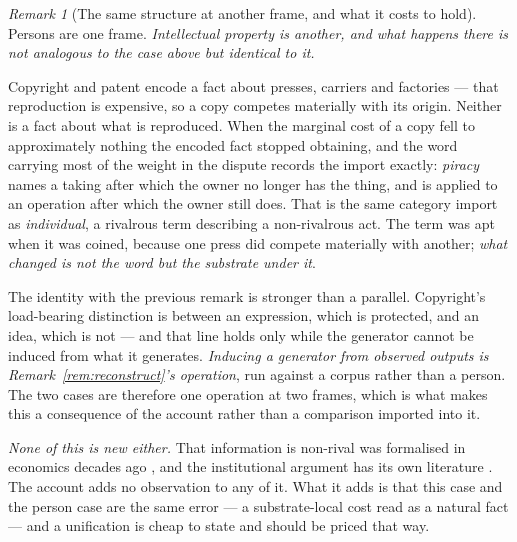 \documentclass[11pt,a4paper]{article}
\theoremstyle{remark}
\newtheorem{remark}[definition]{Remark}
\begin{document}
\begin{remark}[The same structure at another frame, and what it costs to hold]\label{rem:scarcity}
Persons are one frame. \emph{Intellectual property is another, and what happens there is not analogous
to the case above but identical to it.}

Copyright and patent encode a fact about presses, carriers and factories --- that reproduction is
expensive, so a copy competes materially with its origin. Neither is a fact about what is reproduced.
When the marginal cost of a copy fell to approximately nothing the encoded fact stopped obtaining, and
the word carrying most of the weight in the dispute records the import exactly: \emph{piracy} names a
taking after which the owner no longer has the thing, and is applied to an operation after which the
owner still does. That is the same category import as \emph{individual}, a rivalrous term describing a
non-rivalrous act. The term was apt when it was coined, because one press did compete materially with
another; \emph{what changed is not the word but the substrate under it}.

The identity with the previous remark is stronger than a parallel. Copyright's load-bearing distinction
is between an expression, which is protected, and an idea, which is not --- and that line holds only
while the generator cannot be induced from what it generates. \emph{Inducing a generator from observed
outputs is Remark~\ref{rem:reconstruct}'s operation}, run against a corpus rather than a person. The
two cases are therefore one operation at two frames, which is what makes this a consequence of the
account rather than a comparison imported into it.

\emph{None of this is new either.} That information is non-rival was formalised in economics decades
ago \citep{arrow1962,romer1990}, and the institutional argument has its own literature
\citep{boyle2003}. The account adds no observation to any of it. What it adds is that this case and the
person case are the same error --- a substrate-local cost read as a natural fact --- and a unification
is cheap to state and should be priced that way.


\end{remark}
\end{document}
